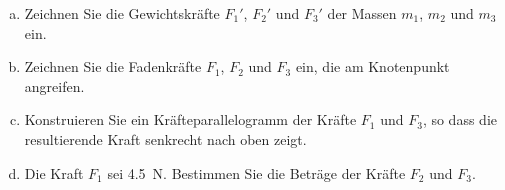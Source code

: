 
\begin{center}
\end{center}

\begin{aufgabe}
	\begin{enumerate} [a)]
		\item Zeichnen Sie die Gewichtskräfte $F_1'$, $F_2'$ und $F_3'$ der Massen $m_1$, $m_2$ und $m_3$ ein.
		\item Zeichnen Sie die Fadenkräfte $F_1$, $F_2$ und $F_3$ ein, die am Knotenpunkt angreifen.
		\item Konstruieren Sie ein Kräfteparallelogramm der Kräfte $F_1$ und $F_3$, so dass die resultierende Kraft senkrecht nach oben zeigt.
		\item Die Kraft $F_1$ sei \SI{4.5}{N}. Bestimmen Sie die Beträge der Kräfte $F_2$ und $F_3$.
	\end{enumerate}
\end{aufgabe}
